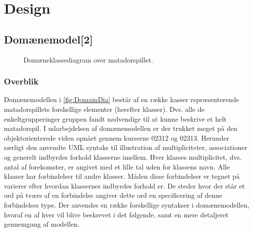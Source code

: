 \chapter{Design}\label{chap:Design}

\section{Domænemodel[2]}\label{chap:domain}

\begin{figure}
\caption{Domæneklassediagram over matadorspillet.}\label{fig:DomainDia}
\centering

\end{figure}

\subsection{Overblik}\label{chap:domain:sec:overblik}
Domænemodellen i \vref{fig:DomainDia} består af en række kasser repræsenterende matadorspillets forskellige elementer (herefter klasser). Dvs. alle de enkeltgrupperinger gruppen fandt nødvendige til at kunne beskrive et helt matadorspil. I udarbejdelsen af domænemodellen er der trukket meget på den objektorienterede viden opnået gennem kurserne 02312 og 02313. Herunder særligt den anvendte UML syntaks til illustration af multipliciteter, associationer og generelt indbyrdes forhold klasserne imellem. Hver klasses multiplicitet, dvs. antal af forekomster, er angivet med et lille tal uden for klassens navn. Alle klasser har forbindelser til andre klasser. Måden disse forbindelser er tegnet på varierer efter hvordan klassernes indbyrdes forhold er. De steder hvor der står et ord på tværs af en forbindelse angiver dette ord en specificering af denne forbindelses type. Der anvendes en række forskellige syntakser i domænemodellen, hvoraf en af hver vil blive beskrevet i det følgende, samt en mere detaljeret gennemgang af modellen.

